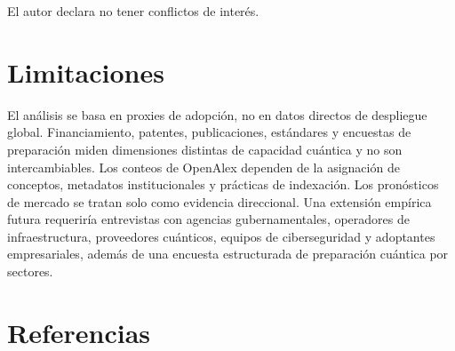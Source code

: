 \documentclass[
  11pt,
  letterpaper,
]{article}
\begin{document}
El autor declara no tener conflictos de interés.

\section{Limitaciones}\label{limitaciones}

El análisis se basa en proxies de adopción, no en datos directos de
despliegue global. Financiamiento, patentes, publicaciones, estándares y
encuestas de preparación miden dimensiones distintas de capacidad
cuántica y no son intercambiables. Los conteos de OpenAlex dependen de
la asignación de conceptos, metadatos institucionales y prácticas de
indexación. Los pronósticos de mercado se tratan solo como evidencia
direccional. Una extensión empírica futura requeriría entrevistas con
agencias gubernamentales, operadores de infraestructura, proveedores
cuánticos, equipos de ciberseguridad y adoptantes empresariales, además
de una encuesta estructurada de preparación cuántica por sectores.

\section{Referencias}\label{referencias}
\end{document}

